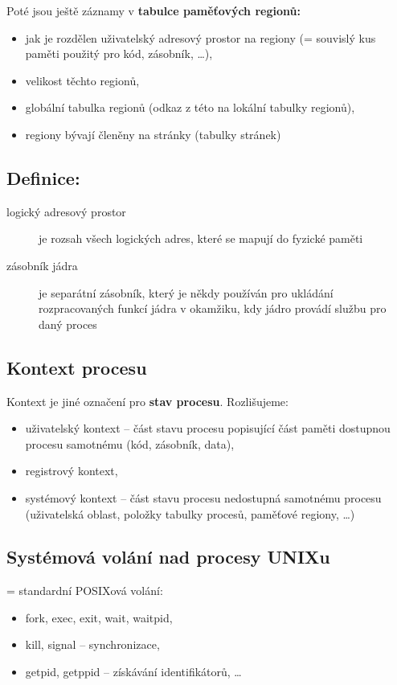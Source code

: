 \documentclass[a4paper, 11pt]{article}
\begin{document}
Poté jsou ještě záznamy v \textbf{tabulce paměťových regionů:}
\begin{itemize}
    \item jak je rozdělen uživatelský adresový prostor na regiony (= souvislý kus paměti použitý pro kód, zásobník, \ldots),
    \item velikost těchto regionů,
    \item globální tabulka regionů (odkaz z této na lokální tabulky regionů),
    \item regiony bývají členěny na stránky (tabulky stránek)
\end{itemize}
 
\subsection*{Definice:}
\begin{description}
\item[logický adresový prostor] je rozsah všech logických adres, které se mapují do fyzické paměti
\item[zásobník jádra] je separátní zásobník, který je někdy používán pro ukládání rozpracovaných funkcí jádra v okamžiku, kdy jádro provádí službu pro daný proces
\end{description}

\subsection{Kontext procesu}
Kontext je jiné označení pro \textbf{stav procesu}. Rozlišujeme:
\begin{itemize}
    \item uživatelský kontext -- část stavu procesu popisující část paměti dostupnou procesu samotnému (kód, zásobník, data),
    \item registrový kontext,
    \item systémový kontext -- část stavu procesu nedostupná samotnému procesu (uživatelská oblast, položky tabulky procesů, paměťové regiony, \ldots)
\end{itemize}

\subsection{Systémová volání nad procesy UNIXu}
= standardní POSIXová volání:
\begin{itemize}
    \item fork, exec, exit, wait, waitpid,
    \item kill, signal -- synchronizace,
    \item getpid, getppid -- získávání identifikátorů, \ldots
\end{itemize}
 
\end{document}
